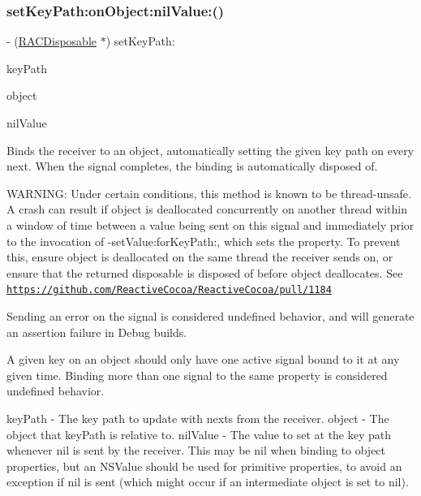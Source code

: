 \subsubsection{\texorpdfstring{set\+Key\+Path\+:on\+Object\+:nil\+Value\+:()}{setKeyPath:onObject:nilValue:()}\hspace{0.1cm}{\footnotesize\ttfamily [1/3]}}
{\footnotesize\ttfamily -\/ (\mbox{\hyperlink{interface_r_a_c_disposable}{R\+A\+C\+Disposable}} $\ast$) set\+Key\+Path\+: \begin{DoxyParamCaption}\item[{(N\+S\+String $\ast$)}]{key\+Path }\item[{onObject:(N\+S\+Object $\ast$)}]{object }\item[{nilValue:(id)}]{nil\+Value }\end{DoxyParamCaption}}

Binds the receiver to an object, automatically setting the given key path on every {\ttfamily next}. When the signal completes, the binding is automatically disposed of.

W\+A\+R\+N\+I\+NG\+: Under certain conditions, this method is known to be thread-\/unsafe. A crash can result if {\ttfamily object} is deallocated concurrently on another thread within a window of time between a value being sent on this signal and immediately prior to the invocation of -\/set\+Value\+:for\+Key\+Path\+:, which sets the property. To prevent this, ensure {\ttfamily object} is deallocated on the same thread the receiver sends on, or ensure that the returned disposable is disposed of before {\ttfamily object} deallocates. See \href{https://github.com/ReactiveCocoa/ReactiveCocoa/pull/1184}{\tt https\+://github.\+com/\+Reactive\+Cocoa/\+Reactive\+Cocoa/pull/1184}

Sending an error on the signal is considered undefined behavior, and will generate an assertion failure in Debug builds.

A given key on an object should only have one active signal bound to it at any given time. Binding more than one signal to the same property is considered undefined behavior.

key\+Path -\/ The key path to update with {\ttfamily next}s from the receiver. object -\/ The object that {\ttfamily key\+Path} is relative to. nil\+Value -\/ The value to set at the key path whenever {\ttfamily nil} is sent by the receiver. This may be nil when binding to object properties, but an N\+S\+Value should be used for primitive properties, to avoid an exception if {\ttfamily nil} is sent (which might occur if an intermediate object is set to {\ttfamily nil}).

